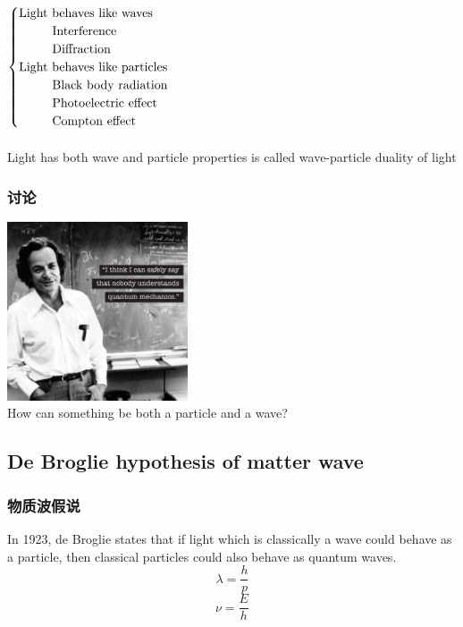 \begin{frame}  
  $\begin{cases}
    \text{Light behaves like waves }\\
    \text{~~\qquad Interference} \\
    \text{~~\qquad Diffraction} \\
    \text{Light behaves like particles}\\
    \text{~~\qquad Black body radiation} \\
    \text{~~\qquad Photoelectric effect} \\
    \text{~~\qquad Compton effect} \\
   \end{cases}$\\
   ~~\\
   Light has both wave and particle properties is called \alert{wave-particle duality} of light
\end{frame}

\begin{frame}   
  \frametitle{讨论}
  \begin{center}
    \includegraphics[width=0.4\textwidth]{figs/noone.jpg} \\
{\color{red} How can something be both a particle and a wave?}
\end{center} 
\end{frame}

\subsection{De Broglie hypothesis of matter wave}

\begin{frame}   
  \frametitle{物质波假说}
  \begin{tcolorbox}[colback=yellow!10,colframe=red!75!black,title=]
  In 1923, de Broglie states that if light which is classically a wave could behave as a particle, 
  then classical particles could also behave as quantum waves.
  \[\lambda=\frac{h}{p}\]
  \[\nu =\frac{E}{h}\]
  \end{tcolorbox}
\end{frame}

